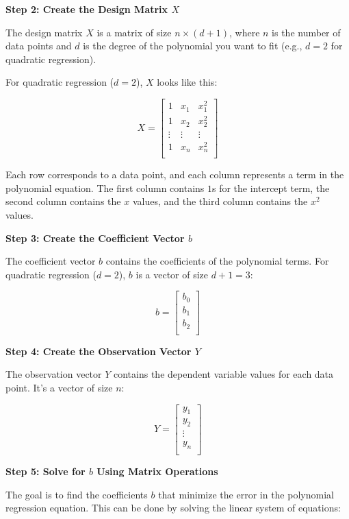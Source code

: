\documentclass[letterpaper,12pt]{article}
\begin{document}
\textbf{Step 2: Create the Design Matrix $X$}

The design matrix $X$ is a matrix of size $n \times (d+1)$, where $n$ is the
number of data points and $d$ is the degree of the polynomial you want to fit
(e.g., $d=2$ for quadratic regression).

For quadratic regression ($d=2$), $X$ looks like this:

\[
    X = \begin{bmatrix}
        1      & x_1    & x_1^2  \\
        1      & x_2    & x_2^2  \\
        \vdots & \vdots & \vdots \\
        1      & x_n    & x_n^2  \\
    \end{bmatrix}
\]

Each row corresponds to a data point, and each column represents a term in the
polynomial equation. The first column contains $1$s for the intercept term, the
second column contains the $x$ values, and the third column contains the $x^2$
values.

\textbf{Step 3: Create the Coefficient Vector $b$}

The coefficient vector $b$ contains the coefficients of the polynomial terms.
For quadratic regression ($d=2$), $b$ is a vector of size $d+1 = 3$:

\[
    b = \begin{bmatrix}
        b_0 \\
        b_1 \\
        b_2 \\
    \end{bmatrix}
\]

\textbf{Step 4: Create the Observation Vector $Y$}

The observation vector $Y$ contains the dependent variable values for each data
point. It's a vector of size $n$:

\[
    Y = \begin{bmatrix}
        y_1    \\
        y_2    \\
        \vdots \\
        y_n    \\
    \end{bmatrix}
\]

\textbf{Step 5: Solve for $b$ Using Matrix Operations}

The goal is to find the coefficients $b$ that minimize the error in the
polynomial regression equation. This can be done by solving the linear system
of equations:
\end{document}
